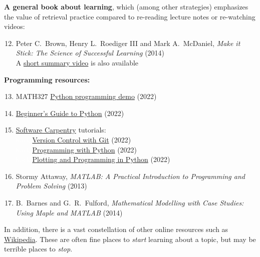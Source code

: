 \noindent\textbf{A general book about learning}, which (among other strategies) emphasizes the value of retrieval practice compared to re-reading lecture notes or re-watching videos: \\[-24 pt]
\begin{enumerate}
  \setcounter{enumi}{11}
  \item Peter C.~Brown, Henry L.~Roediger III and Mark A.~McDaniel, \textit{Make it Stick: The Science of Successful Learning} (2014) \\
        A \href{https://www.youtube.com/watch?v=MfylloWuuZU}{short summary video} is also available
\end{enumerate}

\noindent\textbf{Programming resources:} \\[-24 pt]
\begin{enumerate}
  \setcounter{enumi}{12}
  \item MATH327 \href{https://tinyurl.com/math327demo}{Python programming demo} (2022)
  \item \href{https://wiki.python.org/moin/BeginnersGuide}{Beginner's Guide to Python} (2022)
  \item \href{https://software-carpentry.org}{Software Carpentry} tutorials: \\
        \textcolor{white}{hack} \href{https://swcarpentry.github.io/git-novice/}{Version Control with Git} (2022) \\
        \textcolor{white}{hack} \href{https://swcarpentry.github.io/python-novice-inflammation/}{Programming with Python} (2022) \\
        \textcolor{white}{hack} \href{http://swcarpentry.github.io/python-novice-gapminder/}{Plotting and Programming in Python} (2022)
  \item Stormy Attaway, \textit{MATLAB: A Practical Introduction to Programming and Problem Solving} (2013)
  \item B.~Barnes and G.~R.~Fulford, \textit{Mathematical Modelling with Case Studies: Using Maple and MATLAB} (2014)
\end{enumerate}

In addition, there is a vast constellation of other online resources such as \href{https://en.wikipedia.org/wiki/Statistical_physics}{Wikipedia}.
These are often fine places to \emph{start} learning about a topic, but may be terrible places to \emph{stop}.
